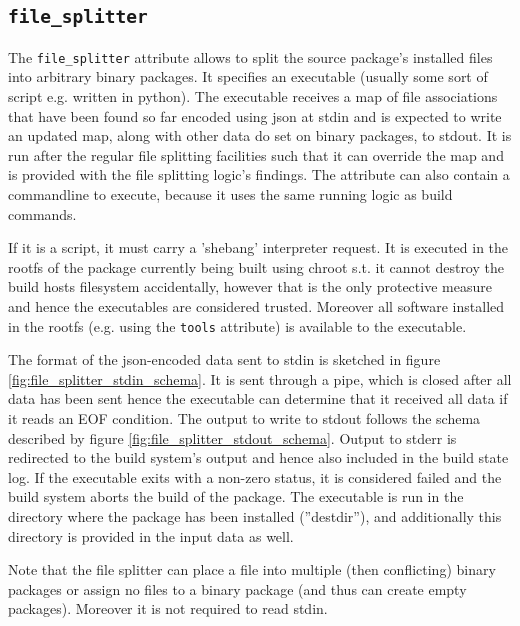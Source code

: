 \documentclass[a4paper]{scrartcl}
\begin{document}
	
	\subsection{\texttt{file\_splitter}}
	\label{sec:file_splitter}
	
	The \texttt{file\_splitter} attribute allows to split the source package's installed files into arbitrary binary packages. It specifies an executable (usually some sort of script e.g. written in python). The executable receives a map of file associations that have been found so far encoded using json at stdin and is expected to write an updated map, along with other data do set on binary packages, to stdout. It is run after the regular file splitting facilities such that it can override the map and is provided with the file splitting logic's findings. The attribute can also contain a commandline to execute, because it uses the same running logic as build commands.
	
	If it is a script, it must carry a 'shebang' interpreter request. It is executed in the rootfs of the package currently being built using chroot s.t. it cannot destroy the build hosts filesystem accidentally, however that is the only protective measure and hence the executables are considered trusted. Moreover all software installed in the rootfs (e.g. using the \texttt{tools} attribute) is available to the executable.
	
	The format of the json-encoded data sent to stdin is sketched in figure \ref{fig:file_splitter_stdin_schema}. It is sent through a pipe, which is closed after all data has been sent hence the executable can determine that it received all data if it reads an EOF condition. The output to write to stdout follows the schema described by figure \ref{fig:file_splitter_stdout_schema}. Output to stderr is redirected to the build system's output and hence also included in the build state log. If the executable exits with a non-zero status, it is considered failed and the build system aborts the build of the package. The executable is run in the directory where the package has been installed (''destdir''), and additionally this directory is provided in the input data as well.
	
	Note that the file splitter can place a file into multiple (then conflicting) binary packages or assign no files to a binary package (and thus can create empty packages). Moreover it is not required to read stdin.
	
\end{document}
